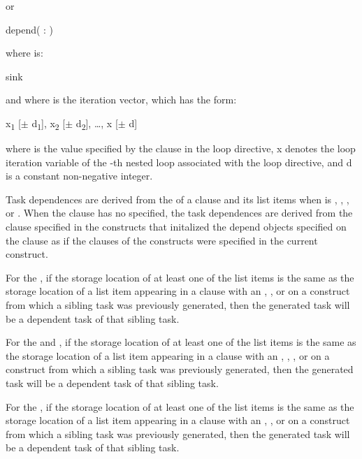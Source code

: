 or

\begin{ompSyntax}
depend( : )
\end{ompSyntax}

where  is:
\begin{indentedcodelist}
sink
\end{indentedcodelist}

and where  is the iteration vector, which has the form:

x\textsubscript{1} [$\pm $ d\textsubscript{1}], x\textsubscript{2} [$\pm $ d\textsubscript{2}], \ldots, x\textsubscript{} [$\pm $ d\textsubscript{}]

where  is the value specified by the  clause in the loop
directive, x\textsubscript{} denotes the loop iteration variable of the -th
nested loop associated with the loop directive, and d\textsubscript{} is a
constant non-negative integer.

\descr
Task dependences are derived from the  of a  clause and its list
items when  is , , , or . When the  clause has no  specified, the task dependences are derived from the  clause specified in the  constructs that initalized the depend objects specified on the  clause as if the  clauses of the  constructs were specified in the current construct. 

For the  , if the storage location of at least one
of the list items is the same as the storage location of a list item appearing
in a  clause with an , , or   on a construct
from which a sibling task was previously generated, then the generated task
will be a dependent task of that sibling task.

For the  and  , if the storage location of at least one
of the list items is the same as the storage location of a list item appearing
in a  clause with an , , , or   on
a construct from which a sibling task was previously generated, then the
generated task will be a dependent task of that sibling task.

For the  , if the storage location of at least one
of the list items is the same as the storage location of a list item appearing
in a  clause with an , , or   on
a construct from which a sibling task was previously generated, then the
generated task will be a dependent task of that sibling task.

